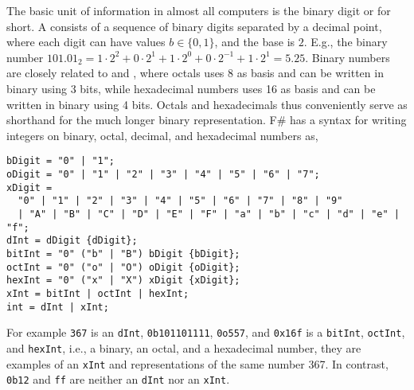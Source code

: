 The basic unit of information in almost all computers is the binary digit or  for short. A  consists of a sequence of binary digits separated by a decimal point, where each digit can have values $b \in \{0,1\}$, and the base is $2$. E.g., the binary number $101.01_2 = 1\cdot 2^2+0\cdot 2^1+1\cdot 2^0+0\cdot 2^{-1}+1\cdot 2^1=5.25$. Binary numbers are closely related to  and , where octals uses 8 as basis and can be written in binary using 3 bits, while hexadecimal numbers uses 16 as basis and can be written in binary using 4 bits. Octals and hexadecimals thus conveniently serve as shorthand for the much longer binary representation. F\# has a syntax for writing integers on binary, octal, decimal, and hexadecimal numbers as,
%
\begin{lstlisting}[language=ebnf]
bDigit = "0" | "1";
oDigit = "0" | "1" | "2" | "3" | "4" | "5" | "6" | "7";
xDigit =  
  "0" | "1" | "2" | "3" | "4" | "5" | "6" | "7" | "8" | "9"
  | "A" | "B" | "C" | "D" | "E" | "F" | "a" | "b" | "c" | "d" | "e" | "f";
dInt = dDigit {dDigit};
bitInt = "0" ("b" | "B") bDigit {bDigit};
octInt = "0" ("o" | "O") oDigit {oDigit};
hexInt = "0" ("x" | "X") xDigit {xDigit};
xInt = bitInt | octInt | hexInt;
int = dInt | xInt;
\end{lstlisting}
%
For example \lstinline!367! is an \lstinline[language=ebnf]!dInt!, \lstinline!0b101101111!, \lstinline!0o557!, and \lstinline!0x16f! is a \lstinline[language=ebnf]!bitInt!, \lstinline[language=ebnf]!octInt!, and \lstinline[language=ebnf]!hexInt!, i.e., a binary, an octal, and a hexadecimal number, they are examples of an \lstinline[language=ebnf]!xInt! and representations of the same number 367. In contrast, \lstinline!0b12! and \lstinline!ff! are neither an \lstinline[language=ebnf]!dInt! nor an \lstinline[language=ebnf]!xInt!.

